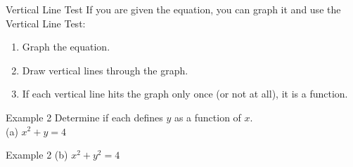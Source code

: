 \documentclass[t,usenames,dvipsnames]{beamer}
\begin{document}
\begin{frame}{Vertical Line Test}
If you are given the equation, you can graph it and use the \alert{Vertical Line Test}: \newline\\ \pause
\begin{enumerate}
    \item<+-> Graph the equation.   \newline\\
    \item<+-> Draw vertical lines through the graph.    \newline\\
    \item<+-> If each vertical line hits the graph only once (or not at all), it is a function.
\end{enumerate}
\end{frame}

\begin{frame}{Example 2}
Determine if each defines $y$ as a function of $x$. \newline\\
(a) \quad   $x^2 + y = 4$   \newline\\  \pause
\begin{minipage}{0.5\textwidth}
\end{minipage}
\hspace{0.25cm}
\begin{minipage}{0.4\textwidth}
\end{minipage}
\end{frame}

\begin{frame}{Example 2}
(b) \quad $x^2 + y^2 = 4$   \newline\\  \pause
\begin{minipage}{0.5\textwidth}
\end{minipage}
\hspace{0.45cm}
\begin{minipage}{0.4\textwidth}
\end{minipage}
\end{frame}
\end{document}
